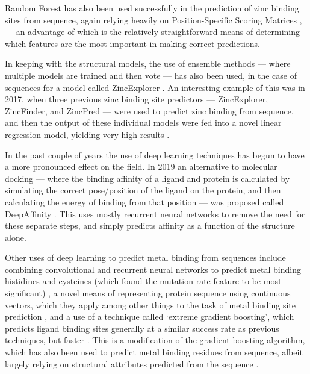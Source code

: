 Random Forest has also been used successfully in the prediction of zinc binding sites from sequence, again relying heavily on Position-Specific Scoring Matrices \cite{zheng2012}, \cite{Kumar2017} --- an advantage of which is the relatively straightforward means of determining which features are the most important in making correct predictions.

In keeping with the structural models, the use of ensemble methods --- where multiple models are trained and then vote --- has also been used, in the case of sequences for a model called ZincExplorer \cite{chen2013}. An interesting example of this was in 2017, when three previous zinc binding site predictors --- ZincExplorer, ZincFinder, and ZincPred --- were used to predict zinc binding from sequence, and then the output of these individual models were fed into a novel linear regression model, yielding very high results \cite{li2017}.

In the past couple of years the use of deep learning techniques has begun to have a more pronounced effect on the field. In 2019 an alternative to molecular docking --- where the binding affinity of a ligand and protein is calculated by simulating the correct pose/position of the ligand on the protein, and then calculating the energy of binding from that position --- was proposed called DeepAffinity \cite{karimi2019}. This uses mostly recurrent neural networks to remove the need for these separate steps, and simply predicts affinity as a function of the structure alone.

Other uses of deep learning to predict metal binding from sequences include combining convolutional and recurrent neural networks to predict metal binding histidines and cysteines (which found the mutation rate feature to be most significant) \cite{Haberal2019}, a novel means of representing protein sequence using continuous vectors, which they apply among other things to the task of metal binding site prediction \cite{heinzinger2019}, and a use of a technique called `extreme gradient boosting', which predicts ligand binding sites generally at a similar success rate as previous techniques, but faster \cite{zhao2019}. This is a modification of the gradient boosting algorithm, which has also been used to predict metal binding residues from sequence, albeit largely relying on structural attributes predicted from the sequence \cite{hu2020}.

